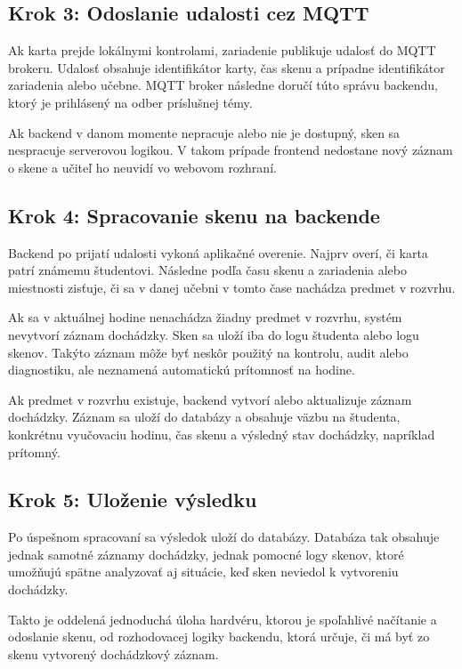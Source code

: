 \subsection{Krok 3: Odoslanie udalosti cez MQTT}

Ak karta prejde lokálnymi kontrolami, zariadenie publikuje udalosť do MQTT brokeru. Udalosť obsahuje identifikátor karty, čas skenu a prípadne identifikátor zariadenia alebo učebne. MQTT broker následne doručí túto správu backendu, ktorý je prihlásený na odber príslušnej témy.

Ak backend v danom momente nepracuje alebo nie je dostupný, sken sa nespracuje serverovou logikou. V takom prípade frontend nedostane nový záznam o skene a učiteľ ho neuvidí vo webovom rozhraní.

\subsection{Krok 4: Spracovanie skenu na backende}

Backend po prijatí udalosti vykoná aplikačné overenie. Najprv overí, či karta patrí známemu študentovi. Následne podľa času skenu a zariadenia alebo miestnosti zisťuje, či sa v danej učebni v tomto čase nachádza predmet v rozvrhu.

Ak sa v aktuálnej hodine nenachádza žiadny predmet v rozvrhu, systém nevytvorí záznam dochádzky. Sken sa uloží iba do logu študenta alebo logu skenov. Takýto záznam môže byť neskôr použitý na kontrolu, audit alebo diagnostiku, ale neznamená automatickú prítomnosť na hodine.

Ak predmet v rozvrhu existuje, backend vytvorí alebo aktualizuje záznam dochádzky. Záznam sa uloží do databázy a obsahuje väzbu na študenta, konkrétnu vyučovaciu hodinu, čas skenu a výsledný stav dochádzky, napríklad prítomný.

\subsection{Krok 5: Uloženie výsledku}

Po úspešnom spracovaní sa výsledok uloží do databázy. Databáza tak obsahuje jednak samotné záznamy dochádzky, jednak pomocné logy skenov, ktoré umožňujú spätne analyzovať aj situácie, keď sken neviedol k vytvoreniu dochádzky.

Takto je oddelená jednoduchá úloha hardvéru, ktorou je spoľahlivé načítanie a odoslanie skenu, od rozhodovacej logiky backendu, ktorá určuje, či má byť zo skenu vytvorený dochádzkový záznam.
